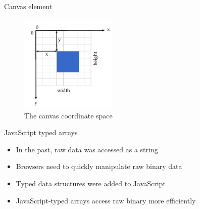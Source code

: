 \documentclass{beamer}
\begin{document}
\begin{frame}{Canvas element}
  \begin{figure}[!htb]
    \centering
    \includegraphics[width=130pt]{../chapters/basic_concepts/canvas_axis.pdf}
    \caption{The canvas coordinate space}
    \label{figure:canvas_axis}
  \end{figure}
\end{frame}
\begin{frame}{JavaScript typed arrays}
  \begin{itemize}
    \item In the past, raw data was accessed as a string
    \item Browsers need to quickly manipulate raw binary data
    \item Typed data structures were added to JavaScript
    \item JavaScript-typed arrays access raw binary more efficiently
  \end{itemize}
\end{frame}
\end{document}
